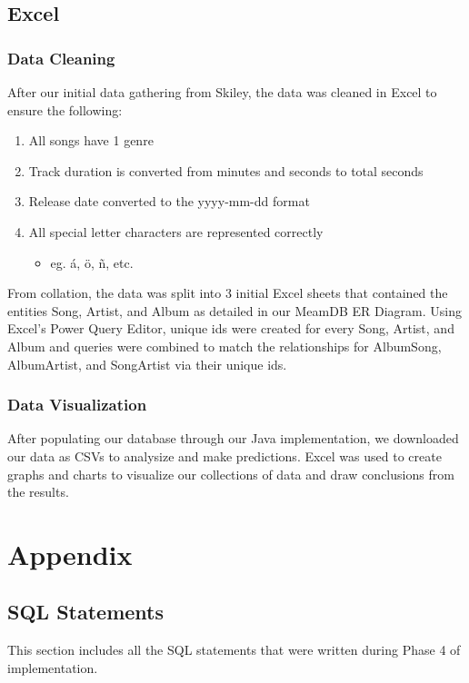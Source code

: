 \documentclass[12pt]{article}
\begin{document}
    \subsection{Excel}
    \subsubsection{Data Cleaning}
    After our initial data gathering from Skiley, the data was cleaned in Excel to ensure
    the following:
    \begin{enumerate}
        \item All songs have 1 genre
        \item Track duration is converted from minutes and seconds to total seconds
        \item Release date converted to the yyyy-mm-dd format
        \item All special letter characters are represented correctly
            \begin{itemize}
                \item eg. \'{a}, \"{o}, \~{n}, etc.
            \end{itemize}
    \end{enumerate}
    From collation, the data was split into 3 initial Excel sheets that contained the entities Song,
    Artist, and Album as detailed in our MeamDB ER Diagram. Using Excel's Power Query Editor, unique
    ids were created for every Song, Artist, and Album and queries were combined to match the relationships
    for AlbumSong, AlbumArtist, and SongArtist via their unique ids.

    \subsubsection{Data Visualization}
    After populating our database through our Java implementation, we downloaded our data as CSVs to
    analysize and make predictions. Excel was used to create graphs and charts to visualize our
    collections of data and draw conclusions from the results.

    \section{Appendix}

    \subsection{SQL Statements}
    This section includes all the SQL statements that were written during Phase 4 of
    implementation.
\end{document}
